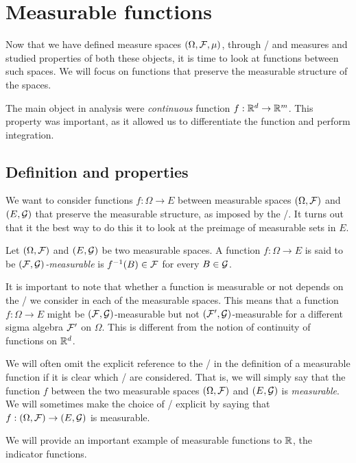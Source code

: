 
\section{Measurable functions}

Now that we have defined measure spaces $(\Omega, \mathcal F, \mu)$, through \sigalgs/ and measures and studied properties of both these objects, it is time to look at functions between such spaces. We will focus on functions that preserve the measurable structure of the spaces.

The main object in analysis were \emph{continuous} function $f : \mathbb R^d \to \mathbb R^m$. This property was important, as it allowed us to differentiate the function and perform integration. 

\subsection{Definition and properties}

We want to consider functions $f : \Omega \to E$ between measurable spaces $(\Omega, \mathcal F)$ and $(E, \mathcal G)$ that preserve the measurable structure, as imposed by the \sigalgs/. It turns out that it the best way to do this it to look at the preimage of measurable sets in $E$.

\begin{definition}\label{def:measurable_function}
Let $(\Omega, \mathcal F)$ and $(E, \mathcal G)$ be two measurable spaces. A function $f: \Omega \to E$ is said to be \emph{$(\mathcal F, \mathcal G)$-measurable} is $f^{-1}(B) \in \mathcal F$ for every $B \in \mathcal G$.
\end{definition}

It is important to note that whether a function is measurable or not depends on the \sigalgs/ we consider in each of the measurable spaces. This means that a function $f : \Omega \to E$ might be $(\mathcal F, \mathcal G)$-measurable but not $(\mathcal F^\prime, \mathcal G)$-measurable for a different sigma algebra $\mathcal F^\prime$ on $\Omega$. This is different from the notion of continuity of functions on $\mathbb R^d$. 

We will often omit the explicit reference to the \sigalgs/ in the definition of a measurable function if it is clear which \sigalgs/ are considered. That is, we will simply say that the function $f$ between the two measurable spaces $(\Omega, \mathcal F)$ and $(E, \mathcal G)$ is \emph{measurable}. We will sometimes make the choice of \sigalgs/ explicit by saying that $f: (\Omega, \mathcal F) \to (E, \mathcal G)$ is measurable.

We will provide an important example of measurable functions to $\mathbb R$, the indicator functions.

